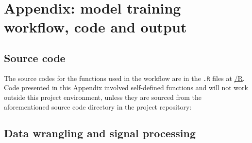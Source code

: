 \documentclass[
]{article}
\newenvironment{Shaded}{\begin{snugshade}}{\end{snugshade}}
\newcommand{\AttributeTok}[1]{\textcolor[rgb]{0.77,0.63,0.00}{#1}}
\newcommand{\ConstantTok}[1]{\textcolor[rgb]{0.00,0.00,0.00}{#1}}
\newcommand{\FunctionTok}[1]{\textcolor[rgb]{0.00,0.00,0.00}{#1}}
\newcommand{\NormalTok}[1]{#1}
\newcommand{\OtherTok}[1]{\textcolor[rgb]{0.56,0.35,0.01}{#1}}
\newcommand{\SpecialCharTok}[1]{\textcolor[rgb]{0.00,0.00,0.00}{#1}}
\newcommand{\StringTok}[1]{\textcolor[rgb]{0.31,0.60,0.02}{#1}}
\begin{document}
\hypertarget{appendix-model-training-workflow-code-and-output}{%
\section{Appendix: model training workflow, code and
output}\label{appendix-model-training-workflow-code-and-output}}

\hypertarget{source-code}{%
\subsection{Source code}\label{source-code}}

The source codes for the functions used in the workflow are in the
\texttt{.R} files at
\href{https://github.com/szmsu2011/comp90072/blob/main/R}{/R}. Code
presented in this Appendix involved self-defined functions and will not
work outside this project environment, unless they are sourced from the
aforementioned source code directory in the project repository:

\begin{Shaded}
\end{Shaded}

\hypertarget{data-wrangling-and-signal-processing}{%
\subsection{Data wrangling and signal
processing}\label{data-wrangling-and-signal-processing}}
\end{document}
